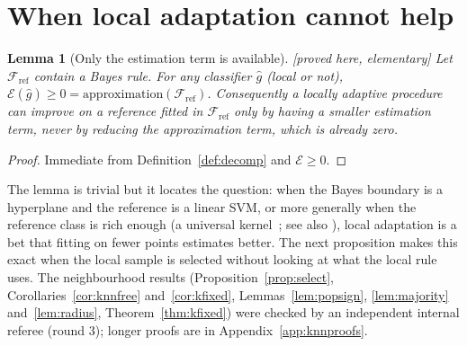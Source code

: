 \documentclass[11pt,a4paper]{article}
\theoremstyle{plain}
\newtheorem{lemma}[theorem]{Lemma}
\theoremstyle{definition}
\theoremstyle{remark}
\newcommand{\status}[1]{\textsf{\small [#1]}}
\begin{document}
\section{When local adaptation cannot help}\label{sec:theory}

\begin{lemma}[Only the estimation term is available]\label{lem:approx}\status{proved here, elementary}
Let $\mathcal F_{\mathrm{ref}}$ contain a Bayes rule. For any classifier $\hat g$ (local or not), $\mathcal E(\hat g)\ge 0=\text{approximation}(\mathcal F_{\mathrm{ref}})$. Consequently a locally adaptive procedure can improve on a reference fitted in $\mathcal F_{\mathrm{ref}}$ only by having a smaller estimation term, never by reducing the approximation term, which is already zero.
\end{lemma}
\begin{proof}
Immediate from Definition~\ref{def:decomp} and $\mathcal E\ge0$.
\end{proof}

The lemma is trivial but it locates the question: when the Bayes boundary is a hyperplane and the reference is a linear SVM, or more generally when the reference class is rich enough (a universal kernel~\citep{micchelli2006}; see also \citet[\S4.6]{steinwart2008}), local adaptation is a bet that fitting on fewer points estimates better. The next proposition makes this exact when the local sample is selected without looking at what the local rule uses. The neighbourhood results (Proposition~\ref{prop:select}, Corollaries~\ref{cor:knnfree} and~\ref{cor:kfixed}, Lemmas~\ref{lem:popsign}, \ref{lem:majority} and~\ref{lem:radius}, Theorem~\ref{thm:kfixed}) were checked by an independent internal referee (round 3); longer proofs are in Appendix~\ref{app:knnproofs}.
\end{document}
